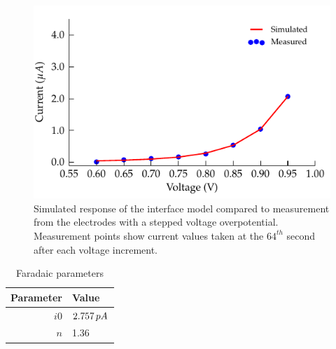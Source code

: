 \documentclass[journal, a4paper]{IEEEtran}
\begin{document}
\begin{figure}
    \begin{center}
        \includegraphics{graphics/faradaic_currentVsVoltageIEEE}
    \end{center}
    \caption{Simulated response of the interface model compared to measurement from the electrodes with a stepped voltage overpotential. Measurement points show current values taken at the $64^{th}$ second after each voltage increment.}
    \label{fig:faradaic_currentVsVoltage}
\end{figure}

\begin{table}
    \caption{Faradaic parameters}
    \label{tab:FaradaicParams}
    \begin{center}
        \begin{tabular}{r | l}
            Parameter & Value \\
            \hline
            $i0$ & $2.757\thinspace pA$\\
            $n$ & 1.36\\
        \end{tabular}
    \end{center}
\end{table}

\end{document}
